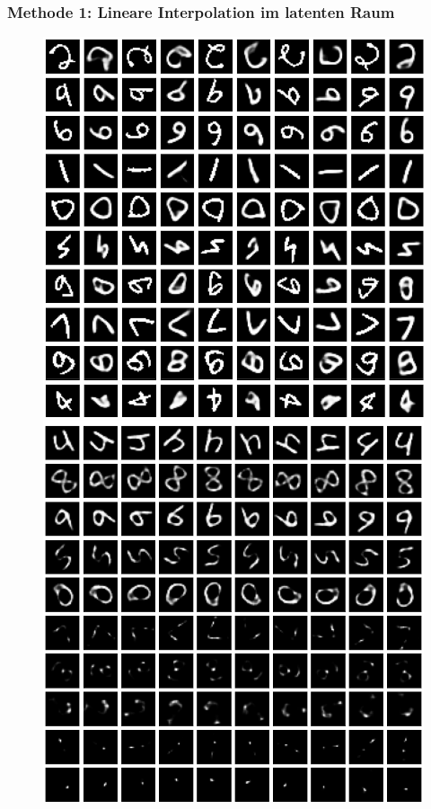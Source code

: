\documentclass[12pt]{article}
\begin{document}
	\subsubsection{Methode 1: Lineare Interpolation im latenten Raum}
	\begin{figure}[h!]
	\begin{minipage}{0.5\textwidth}
		\includegraphics[scale=0.395]{interpolation}
	\end{minipage}
	\begin{minipage}{0.5\textwidth}
		\includegraphics[scale=0.33]{rotatingMNIST_VAElat}
	\end{minipage}
	\end{figure}
\end{document}
